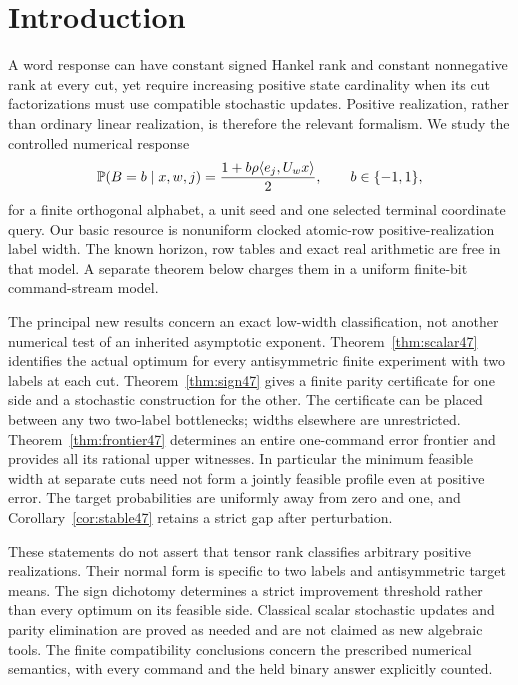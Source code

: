 \section{Introduction}
A word response can have constant signed Hankel rank and constant
nonnegative rank at every cut, yet require increasing positive state
cardinality when its cut factorizations must use compatible stochastic
updates. Positive realization, rather than ordinary linear realization,
is therefore the relevant formalism. We study the controlled numerical
response
\begin{equation}\label{eq:target}
 \mathbb P(B=b\mid x,w,j)=\frac{1+b\rho\langle e_j,U_wx\rangle}2,
 \qquad b\in\{-1,1\},
\end{equation}
for a finite orthogonal alphabet, a unit seed and one selected terminal
coordinate query. Our basic resource is nonuniform clocked atomic-row
positive-realization label width. The known horizon, row tables and
exact real arithmetic are free in that model. A separate theorem below
charges them in a uniform finite-bit command-stream model.

The principal new results concern an exact low-width classification,
not another numerical test of an inherited asymptotic exponent.
Theorem~\ref{thm:scalar47} identifies the actual optimum for every
antisymmetric finite experiment with two labels at each cut.
Theorem~\ref{thm:sign47} gives a finite parity certificate for one side
and a stochastic construction for the other. The certificate can be
placed between any two two-label bottlenecks; widths elsewhere are
unrestricted. Theorem~\ref{thm:frontier47} determines an entire
one-command error frontier and provides all its rational upper
witnesses. In particular the minimum feasible width at separate cuts
need not form a jointly feasible profile even at positive error.
The target probabilities are uniformly away from zero and one, and
Corollary~\ref{cor:stable47} retains a strict gap after perturbation.

These statements do not assert that tensor rank classifies arbitrary
positive realizations. Their normal form is specific to two labels
and antisymmetric target means. The sign dichotomy determines a strict
improvement threshold rather than every optimum on its feasible side.
Classical scalar stochastic updates and parity elimination are proved
as needed and are not claimed as new algebraic tools. The finite
compatibility conclusions concern the prescribed numerical semantics,
with every command and the held binary answer explicitly counted.

